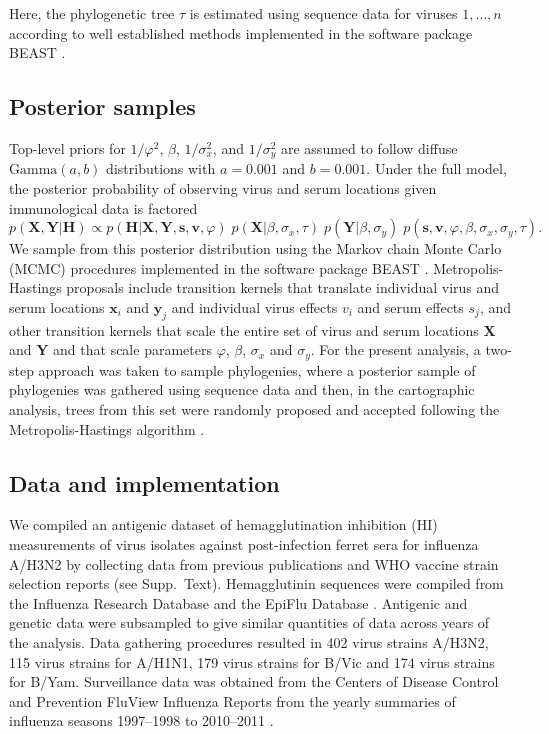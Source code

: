 \documentclass[11pt,oneside,letterpaper]{article}
\newcommand{\virus}{\mathbf{x}}						%
\newcommand{\serum}{\mathbf{y}}						%
\newcommand{\viruses}{\mathbf{X}}					%
\newcommand{\sera}{\mathbf{Y}}						%
\newcommand{\ve}{v}									%
\newcommand{\se}{s}									%
\newcommand{\ves}{\mathbf{v}}						%
\newcommand{\ses}{\mathbf{s}}						%
\newcommand{\mdssd}{\varphi}						%
\newcommand{\virussd}{\sigma_x}						%
\newcommand{\serumsd}{\sigma_y}						%
\newcommand{\tree}{\tau}							%
\newcommand{\vn}{n}									%
\begin{document}
Here, the phylogenetic tree $\tree$ is estimated using sequence data for viruses $1,\ldots,\vn$ according to well established methods implemented in the software package BEAST \cite{BEAST, BEAST17}.

\subsection*{Posterior samples}

Top-level priors for $1/\mdssd^2$, $\beta$, $1/\virussd^2$, and $1/\serumsd^2$ are assumed to follow diffuse $\mbox{Gamma}(a, b)$ distributions  with $a=0.001$ and $b=0.001$.
Under the full model, the posterior probability of observing virus and serum locations given immunological data is factored
\begin{equation}
	p(\viruses,\sera | \mathbf{H}) \propto p(\mathbf{H} | \viruses, \sera, \ses, \ves, \mdssd) \; 
	p(\viruses | \beta, \virussd, \tree) \;
	p(\sera | \beta, \serumsd) \; 
	p(\ses, \ves, \mdssd, \beta, \virussd, \serumsd, \tree).
\end{equation}
We sample from this posterior distribution using the Markov chain Monte Carlo (MCMC) procedures implemented in the software package BEAST \cite{BEAST,BEAST17}.
Metropolis-Hastings proposals include transition kernels that translate individual virus and serum locations $\virus_i$ and $\serum_j$ and individual virus effects $\ve_i$ and serum effects $\se_j$, and other transition kernels that scale the entire set of virus and serum locations $\viruses$ and $\sera$ and that scale parameters $\mdssd$, $\beta$, $\virussd$ and $\serumsd$.
For the present analysis, a two-step approach was taken to sample phylogenies, where a posterior sample of phylogenies was gathered using sequence data and then, in the cartographic analysis, trees from this set were randomly proposed and accepted following the Metropolis-Hastings algorithm \cite{Pagel04}.

\subsection*{Data and implementation}

We compiled an antigenic dataset of hemagglutination inhibition (HI) measurements of virus isolates against post-infection ferret sera for influenza A/H3N2 by collecting data from previous publications and WHO vaccine strain selection reports (see Supp.\ Text).
Hemagglutinin sequences were compiled from the Influenza Research Database \cite{IRD} and the EpiFlu Database \cite{GISAID}.
Antigenic and genetic data were subsampled to give similar quantities of data across years of the analysis.
Data gathering procedures resulted in 402 virus strains A/H3N2, 115 virus strains for A/H1N1, 179 virus strains for B/Vic and 174 virus strains for B/Yam.
Surveillance data was obtained from the Centers of Disease Control and Prevention FluView Influenza Reports from the yearly summaries of influenza seasons 1997--1998 to 2010--2011 \cite{CDCReports}.
\end{document}
